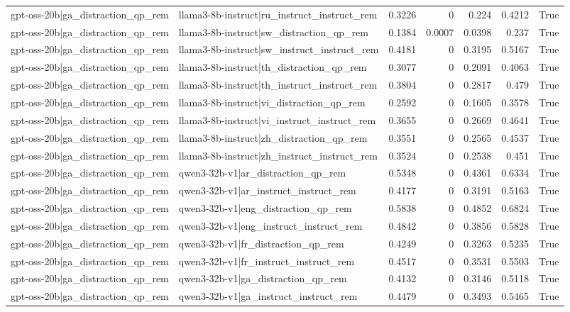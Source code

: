 \begin{table}
\begin{tabular}{l l r r r r l}
gpt-oss-20b|ga_distraction_qp_rem & llama3-8b-instruct|ru_instruct_instruct_rem & 0.3226 & 0 & 0.224 & 0.4212 & True \\
gpt-oss-20b|ga_distraction_qp_rem & llama3-8b-instruct|sw_distraction_qp_rem & 0.1384 & 0.0007 & 0.0398 & 0.237 & True \\
gpt-oss-20b|ga_distraction_qp_rem & llama3-8b-instruct|sw_instruct_instruct_rem & 0.4181 & 0 & 0.3195 & 0.5167 & True \\
gpt-oss-20b|ga_distraction_qp_rem & llama3-8b-instruct|th_distraction_qp_rem & 0.3077 & 0 & 0.2091 & 0.4063 & True \\
gpt-oss-20b|ga_distraction_qp_rem & llama3-8b-instruct|th_instruct_instruct_rem & 0.3804 & 0 & 0.2817 & 0.479 & True \\
gpt-oss-20b|ga_distraction_qp_rem & llama3-8b-instruct|vi_distraction_qp_rem & 0.2592 & 0 & 0.1605 & 0.3578 & True \\
gpt-oss-20b|ga_distraction_qp_rem & llama3-8b-instruct|vi_instruct_instruct_rem & 0.3655 & 0 & 0.2669 & 0.4641 & True \\
gpt-oss-20b|ga_distraction_qp_rem & llama3-8b-instruct|zh_distraction_qp_rem & 0.3551 & 0 & 0.2565 & 0.4537 & True \\
gpt-oss-20b|ga_distraction_qp_rem & llama3-8b-instruct|zh_instruct_instruct_rem & 0.3524 & 0 & 0.2538 & 0.451 & True \\
gpt-oss-20b|ga_distraction_qp_rem & qwen3-32b-v1|ar_distraction_qp_rem & 0.5348 & 0 & 0.4361 & 0.6334 & True \\
gpt-oss-20b|ga_distraction_qp_rem & qwen3-32b-v1|ar_instruct_instruct_rem & 0.4177 & 0 & 0.3191 & 0.5163 & True \\
gpt-oss-20b|ga_distraction_qp_rem & qwen3-32b-v1|eng_distraction_qp_rem & 0.5838 & 0 & 0.4852 & 0.6824 & True \\
gpt-oss-20b|ga_distraction_qp_rem & qwen3-32b-v1|eng_instruct_instruct_rem & 0.4842 & 0 & 0.3856 & 0.5828 & True \\
gpt-oss-20b|ga_distraction_qp_rem & qwen3-32b-v1|fr_distraction_qp_rem & 0.4249 & 0 & 0.3263 & 0.5235 & True \\
gpt-oss-20b|ga_distraction_qp_rem & qwen3-32b-v1|fr_instruct_instruct_rem & 0.4517 & 0 & 0.3531 & 0.5503 & True \\
gpt-oss-20b|ga_distraction_qp_rem & qwen3-32b-v1|ga_distraction_qp_rem & 0.4132 & 0 & 0.3146 & 0.5118 & True \\
gpt-oss-20b|ga_distraction_qp_rem & qwen3-32b-v1|ga_instruct_instruct_rem & 0.4479 & 0 & 0.3493 & 0.5465 & True \\

\end{tabular}
\end{table}
